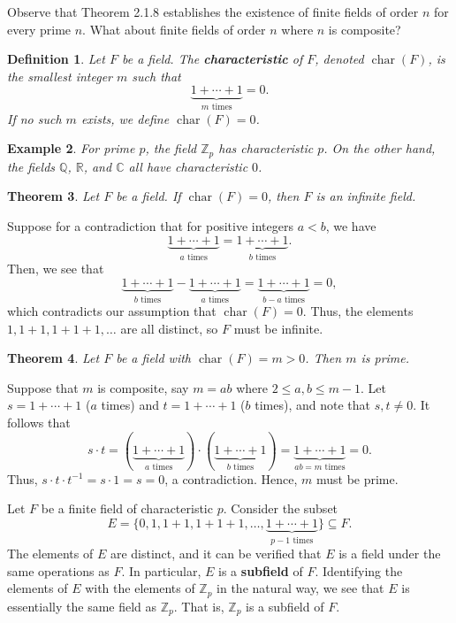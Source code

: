 \documentclass[10pt]{article}
\makeatletter
\newcommand{\R}{\mathbb{R}}
\newcommand{\C}{\mathbb{C}}
\newcommand{\Z}{\mathbb{Z}}
\newcommand{\Q}{\mathbb{Q}}
\DeclareMathOperator{\ch}{char}
\theoremstyle{newstyle}
\newtheorem{thm}{Theorem}[subsection]
\newtheorem{defn}[thm]{Definition}
\newtheorem{exmp}[thm]{Example}
\newenvironment{pf}[1][\proofname]{\par
  \pushQED{\qed}%
  \normalfont \topsep0\p@\relax
  \trivlist
  \item[\hskip\labelsep\scshape
  #1\@addpunct{.}]\ignorespaces
}{%
  \popQED\endtrivlist\@endpefalse
}
\makeatother
\begin{document}
Observe that Theorem 2.1.8 establishes the existence of finite fields of order $n$ for every 
prime $n$. What about finite fields of order $n$ where $n$ is composite?

\begin{defn}
Let $F$ be a field. The {\bf characteristic} of $F$, denoted $\ch(F)$, is the smallest integer 
$m$ such that 
\[ \underbrace{1 + \cdots + 1}_{\text{$m$ times}} = 0. \]
If no such $m$ exists, we define $\ch(F) = 0$. 
\end{defn}

\begin{exmp}
For prime $p$, the field $\Z_p$ has characteristic $p$. On the other hand, the fields 
$\Q$, $\R$, and $\C$ all have characteristic $0$.
\end{exmp}

\begin{thm}
Let $F$ be a field. If $\ch(F) = 0$, then $F$ is an infinite field. 
\end{thm}
\begin{pf}
Suppose for a contradiction that for positive integers $a < b$, we have
\[ \underbrace{1 + \cdots + 1}_{\text{$a$ times}} = \underbrace{1 + \cdots + 1}_{\text{$b$ times}}. \]
Then, we see that 
\[ \underbrace{1 + \cdots + 1}_{\text{$b$ times}} - \underbrace{1 + \cdots + 1}_{\text{$a$ times}} 
= \underbrace{1 + \cdots + 1}_{\text{$b-a$ times}} = 0, \]
which contradicts our assumption that $\ch(F) = 0$. Thus, the elements 
$1, 1+1, 1+1+1, \dots$ are all distinct, so $F$ must be infinite.
\end{pf}

\begin{thm}
Let $F$ be a field with $\ch(F) = m > 0$. Then $m$ is prime. 
\end{thm}
\begin{pf}
Suppose that $m$ is composite, say $m = ab$ where $2 \leq a, b \leq m-1$. Let 
$s = 1 + \cdots + 1$ ($a$ times) and $t = 1 + \cdots + 1$ ($b$ times), and note that 
$s, t \neq 0$. It follows that 
\[ s \cdot t = (\underbrace{1 + \cdots + 1}_{\text{$a$ times}}) \cdot 
(\underbrace{1 + \cdots + 1}_{\text{$b$ times}}) = 
\underbrace{1 + \cdots + 1}_{\text{$ab=m$ times}} = 0. \]
Thus, $s \cdot t \cdot t^{-1} = s \cdot 1 = s = 0$, a contradiction. Hence, $m$ must be prime.
\end{pf}

Let $F$ be a finite field of characteristic $p$. Consider the subset 
\[ E = \{0, 1, 1+1, 1+1+1, \dots, \underbrace{1 + \cdots + 1}_{\text{$p-1$ times}}\} \subseteq F. \]
The elements of $E$ are distinct, and it can be verified that $E$ is a field under the same 
operations as $F$. In particular, $E$ is a {\bf subfield} of $F$. Identifying the elements 
of $E$ with the elements of $\Z_p$ in the natural way, we see that $E$ is essentially the 
same field as $\Z_p$. That is, $\Z_p$ is a subfield of $F$.
\end{document}
